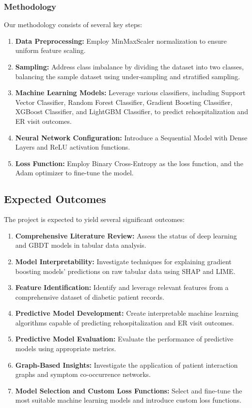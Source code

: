 \documentclass{article}
\begin{document}
\subsubsection{Methodology}
Our methodology consists of several key steps:
\begin{enumerate}
\item \textbf{Data Preprocessing:} Employ MinMaxScaler normalization to ensure uniform feature scaling.
\item \textbf{Sampling:} Address class imbalance by dividing the dataset into two classes, balancing the sample dataset using under-sampling and stratified sampling.
\item \textbf{Machine Learning Models:} Leverage various classifiers, including Support Vector Classifier, Random Forest Classifier, Gradient Boosting Classifier, XGBoost Classifier, and LightGBM Classifier, to predict rehospitalization and ER visit outcomes.
\item \textbf{Neural Network Configuration:} Introduce a Sequential Model with Dense Layers and ReLU activation functions.
\item \textbf{Loss Function:} Employ Binary Cross-Entropy as the loss function, and the Adam optimizer to fine-tune the model.
\end{enumerate}

\subsection{Expected Outcomes}
The project is expected to yield several significant outcomes:
\begin{enumerate}
\item \textbf{Comprehensive Literature Review:} Assess the status of deep learning and GBDT models in tabular data analysis.
\item \textbf{Model Interpretability:} Investigate techniques for explaining gradient boosting models' predictions on raw tabular data using SHAP and LIME.
\item \textbf{Feature Identification:} Identify and leverage relevant features from a comprehensive dataset of diabetic patient records.
\item \textbf{Predictive Model Development:} Create interpretable machine learning algorithms capable of predicting rehospitalization and ER visit outcomes.
\item \textbf{Predictive Model Evaluation:} Evaluate the performance of predictive models using appropriate metrics.
\item \textbf{Graph-Based Insights:} Investigate the application of patient interaction graphs and symptom co-occurrence networks.
\item \textbf{Model Selection and Custom Loss Functions:} Select and fine-tune the most suitable machine learning models and introduce custom loss functions.
\end{enumerate}
\end{document}
